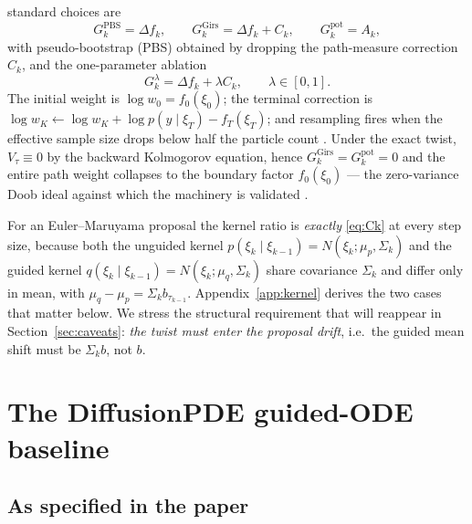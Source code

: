 \documentclass[11pt]{article}
\begin{document}
standard choices are
\begin{equation}\label{eq:three-increments}
  G^{\mathrm{PBS}}_k = \Delta f_k,
  \qquad
  G^{\mathrm{Girs}}_k = \Delta f_k + C_k,
  \qquad
  G^{\mathrm{pot}}_k = A_k,
\end{equation}
with pseudo-bootstrap (PBS) obtained by dropping the path-measure correction $C_k$, and the
one-parameter ablation
\begin{equation}\label{eq:lambda}
  G^\lambda_k = \Delta f_k + \lambda C_k, \qquad \lambda\in[0,1].
\end{equation}
The initial weight is $\log w_0 = f_0(\xi_0)$; the terminal correction is
$\log w_K\leftarrow\log w_K+\log p(y\mid\xi_T)-f_T(\xi_T)$; and resampling fires when the effective
sample size drops below half the particle count \citep{chopin2020smc}. Under the exact twist,
$V_\tau\equiv0$ by the backward Kolmogorov equation, hence $G^{\mathrm{Girs}}_k=G^{\mathrm{pot}}_k=0$
and the entire path weight collapses to the boundary factor $f_0(\xi_0)$ --- the zero-variance Doob
ideal against which the machinery is validated \citep{note1,note2}.

For an Euler--Maruyama proposal the kernel ratio is \emph{exactly} \eqref{eq:Ck} at every step size,
because both the unguided kernel $p(\xi_k\mid\xi_{k-1})=N(\xi_k;\mu_p,\Sigma_k)$ and the guided
kernel $q(\xi_k\mid\xi_{k-1})=N(\xi_k;\mu_q,\Sigma_k)$ share covariance $\Sigma_k$ and differ only in
mean, with $\mu_q-\mu_p=\Sigma_k b_{\tau_{k-1}}$. Appendix~\ref{app:kernel} derives the two cases
that matter below. We stress the structural requirement that will reappear in
Section~\ref{sec:caveats}: \emph{the twist must enter the proposal drift}, i.e.\ the guided mean
shift must be $\Sigma_k b$, not $b$.

\section{The DiffusionPDE guided-ODE baseline}\label{sec:baseline}

\subsection{As specified in the paper}
\end{document}
